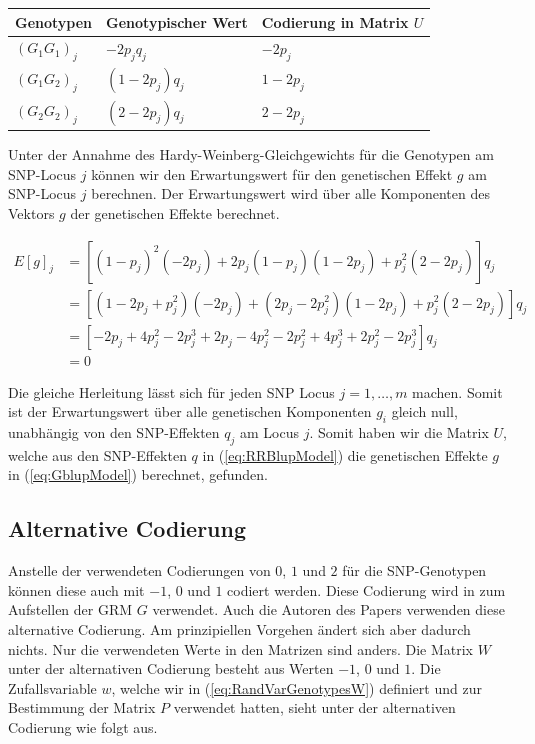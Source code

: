 \documentclass[]{book}
\begin{document}
\vspace{2ex}\begin{center}
\begin{tabular}{|l|l|l|}
\hline
Genotypen     &  Genotypischer Wert            &  Codierung in Matrix $U$\\
\hline
$(G_1G_1)_j$  &  $-2p_jq_j$      &  $-2p_j$\\
$(G_1G_2)_j$  &  $(1-2p_j)q_j$   &  $1-2p_j$\\
$(G_2G_2)_j$  &  $(2-2p_j)q_j$   &  $2-2p_j$\\
\hline
\end{tabular}
\end{center}

\vspace{2ex}

Unter der Annahme des Hardy-Weinberg-Gleichgewichts für die Genotypen am
SNP-Locus \(j\) können wir den Erwartungswert für den genetischen Effekt
\(g\) am SNP-Locus \(j\) berechnen. Der Erwartungswert wird über alle
Komponenten des Vektors \(g\) der genetischen Effekte berechnet.

\begin{equation}
\begin{split}
E\left[g\right]_j & = \left[(1-p_j)^2(-2p_j) + 2p_j(1-p_j)(1-2p_j) + p_j^2(2-2p_j)\right]q_j\\
  & = \left[(1 - 2p_j + p_j^2)(-2p_j) + (2p_j - 2p_j^2)(1-2p_j) + p_j^2(2-2p_j)\right]q_j\\
  & = \left[-2p_j + 4p_j^2 - 2p_j^3 + 2p_j - 4p_j^2 - 2p_j^2 + 4p_j^3 + 2p_j^2 - 2p_j^3\right]q_j\\
  & = 0
\end{split}
\label{eq:ExpectedValueGj}
\end{equation}

Die gleiche Herleitung lässt sich für jeden SNP Locus
\(j = 1,\ldots, m\) machen. Somit ist der Erwartungswert über alle
genetischen Komponenten \(g_i\) gleich null, unabhängig von den
SNP-Effekten \(q_j\) am Locus \(j\). Somit haben wir die Matrix \(U\),
welche aus den SNP-Effekten \(q\) in (\ref{eq:RRBlupModel}) die
genetischen Effekte \(g\) in (\ref{eq:GblupModel}) berechnet, gefunden.

\subsection{Alternative Codierung}\label{alternative-codierung}

Anstelle der verwendeten Codierungen von \(0\), \(1\) und \(2\) für die
SNP-Genotypen können diese auch mit \(-1\), \(0\) und \(1\) codiert
werden. Diese Codierung wird in \citep{VanRaden2008} zum Aufstellen der
GRM \(G\) verwendet. Auch die Autoren des Papers \citep{GDHMF2009}
verwenden diese alternative Codierung. Am prinzipiellen Vorgehen ändert
sich aber dadurch nichts. Nur die verwendeten Werte in den Matrizen sind
anders. Die Matrix \(W\) unter der alternativen Codierung besteht aus
Werten \(-1\), \(0\) und \(1\). Die Zufallsvariable \(w\), welche wir in
(\ref{eq:RandVarGenotypesW}) definiert und zur Bestimmung der Matrix
\(P\) verwendet hatten, sieht unter der alternativen Codierung wie folgt
aus.
\end{document}
